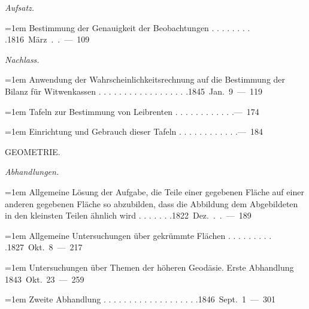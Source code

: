 \noindent\textit{Aufsatz.}\par
\par\noindent\hangindent=1em Bestimmung der Genauigkeit der Beobachtungen . . . . . . . . .\hfill{}\hbox{}\nobreak\hfill\mbox{1816 März . . — 109}\par
\par\medskip{}
\noindent\textit{Nachlass.}\par
\par\noindent\hangindent=1em Anwendung der Wahrscheinlichkeitsrechnung auf die Bestimmung der Bilanz für Witwenkassen . . . . . . . . . . . . . . . . . .\hfill{}\hbox{}\nobreak\hfill\mbox{1845 Jan. 9 — 119}\par
\par\noindent\hangindent=1em Tafeln zur Bestimmung von Leibrenten . . . . . . . . . . . .\hfill{}\hbox{}\nobreak\hfill\mbox{— 174}\par
\par\noindent\hangindent=1em Einrichtung und Gebrauch dieser Tafeln . . . . . . . . . . . .\hfill{}\hbox{}\nobreak\hfill\mbox{— 184}\par
\par\medskip{}
\begin{center}GEOMETRIE.\end{center}
\par\medskip{}
\noindent\textit{Abhandlungen.}\par
\par\noindent\hangindent=1em Allgemeine Lösung der Aufgabe, die Teile einer gegebenen Fläche auf einer anderen gegebenen Fläche so abzubilden, dass die Abbildung dem Abgebildeten in den kleinsten Teilen ähnlich wird . . . . . . .\hfill{}\hbox{}\nobreak\hfill\mbox{1822 Dez. . . — 189}\par
\par\noindent\hangindent=1em Allgemeine Untersuchungen über gekrümmte Flächen . . . . . . . . . .\hfill{}\hbox{}\nobreak\hfill\mbox{1827 Okt. 8 — 217}\par
\par\noindent\hangindent=1em Untersuchungen über Themen der höheren Geodäsie. Erste Abhandlung \hfill{}\hbox{}\nobreak\hfill\mbox{1843 Okt. 23 — 259}\par
\par\noindent\hangindent=1em Zweite Abhandlung . . . . . . . . . . . . . . . . . . .\hfill{}\hbox{}\nobreak\hfill\mbox{1846 Sept. 1 — 301}\par
\endgroup
